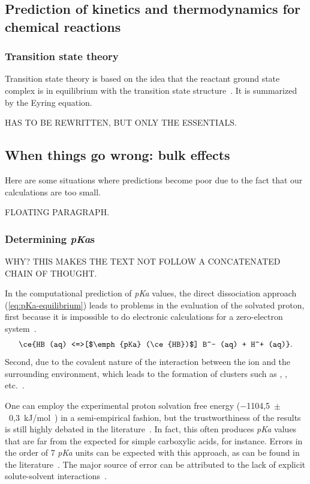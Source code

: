 \subsection{Prediction of kinetics and thermodynamics for chemical reactions}

\subsubsection{Transition state theory}%
\label{sec:tst}

Transition state theory
is based on the idea that the reactant ground state complex is in equilibrium
with the transition state structure~\cite{TransitionStateTheory}.
It is summarized by the Eyring equation.

HAS TO BE REWRITTEN,
BUT ONLY THE ESSENTIALS.\@

\subsection{When things go wrong:
	bulk effects}

Here are some situations where predictions become poor due to the fact that our
calculations are too small.

FLOATING PARAGRAPH.\@

\subsubsection{Determining \emph{pKa}s}%
\label{sec:pka}

WHY?\@
THIS MAKES THE TEXT NOT FOLLOW A CONCATENATED CHAIN OF THOUGHT.\@

In the computational prediction of \emph{pKa} values,
the direct dissociation approach (\cref{eq:pKa-equilibrium})
leads to problems in the evaluation of the solvated proton,
first because it is impossible to do electronic calculations for a zero-electron
system~\cite{Ding_2009,Sumon_2012}.
%
\begin{equation}
	\ce{HB (aq) <=>[$\emph{pKa} (\ce{HB})$] B^- (aq) + H^+ (aq)}\text{.}
	\label{eq:pKa-equilibrium}
\end{equation}
%
Second,
due to the covalent nature of the interaction between the  ion
and the surrounding environment,
which leads to the formation of clusters such
as ,
,
etc.~\cite{Sumon_2012}.

One can employ the experimental proton solvation free energy
($-$1104,5~$\pm$~0,3~kJ/mol~\cite{Tissandier_1998,Marenich_2009}) in a
semi-empirical fashion,
but the trustworthiness of the results is still highly
debated in the literature~\cite{Yang_2013}.
In fact,
this often produces \emph{pKa} values that are far from the expected
for simple carboxylic acids,
for instance.
Errors in the order of 7 \emph{pKa} units can be expected with this approach,
as can be found in the literature~\cite{Pliego_2002,Ding_2009}.
The major source of error can be attributed to the lack of explicit
solute-solvent interactions~\cite{Pliego_2002}.

